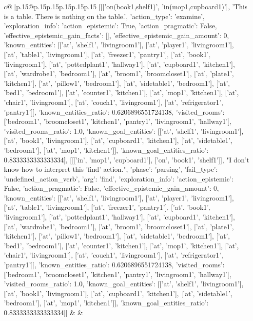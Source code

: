\documentclass{article}
\begin{document}
{\begin{supertabular}{c@{$\;$}|p{.15\linewidth}@{}p{.15\linewidth}p{.15\linewidth}p{.15\linewidth}p{.15\linewidth}p{.15\linewidth}}
{{{	 [[['on(book1,shelf1)', 'in(mop1,cupboard1)'], 'This is a table. There is nothing on the table.', {'action_type': 'examine', 'exploration_info': {'action_epistemic': True, 'action_pragmatic': False, 'effective_epistemic_gain_facts': [], 'effective_epistemic_gain_amount': 0, 'known_entities': [['at', 'shelf1', 'livingroom1'], ['at', 'player1', 'livingroom1'], ['at', 'table1', 'livingroom1'], ['at', 'freezer1', 'pantry1'], ['at', 'book1', 'livingroom1'], ['at', 'pottedplant1', 'hallway1'], ['at', 'cupboard1', 'kitchen1'], ['at', 'wardrobe1', 'bedroom1'], ['at', 'broom1', 'broomcloset1'], ['at', 'plate1', 'kitchen1'], ['at', 'pillow1', 'bedroom1'], ['at', 'sidetable1', 'bedroom1'], ['at', 'bed1', 'bedroom1'], ['at', 'counter1', 'kitchen1'], ['at', 'mop1', 'kitchen1'], ['at', 'chair1', 'livingroom1'], ['at', 'couch1', 'livingroom1'], ['at', 'refrigerator1', 'pantry1']], 'known_entities_ratio': 0.6206896551724138, 'visited_rooms': ['bedroom1', 'broomcloset1', 'kitchen1', 'pantry1', 'livingroom1', 'hallway1'], 'visited_rooms_ratio': 1.0, 'known_goal_entities': [['at', 'shelf1', 'livingroom1'], ['at', 'book1', 'livingroom1'], ['at', 'cupboard1', 'kitchen1'], ['at', 'sidetable1', 'bedroom1'], ['at', 'mop1', 'kitchen1']], 'known_goal_entities_ratio': 0.8333333333333334}}], [[['in', 'mop1', 'cupboard1'], ['on', 'book1', 'shelf1']], "I don't know how to interpret this 'find' action.", {'phase': 'parsing', 'fail_type': 'undefined_action_verb', 'arg': 'find', 'exploration_info': {'action_epistemic': False, 'action_pragmatic': False, 'effective_epistemic_gain_amount': 0, 'known_entities': [['at', 'shelf1', 'livingroom1'], ['at', 'player1', 'livingroom1'], ['at', 'table1', 'livingroom1'], ['at', 'freezer1', 'pantry1'], ['at', 'book1', 'livingroom1'], ['at', 'pottedplant1', 'hallway1'], ['at', 'cupboard1', 'kitchen1'], ['at', 'wardrobe1', 'bedroom1'], ['at', 'broom1', 'broomcloset1'], ['at', 'plate1', 'kitchen1'], ['at', 'pillow1', 'bedroom1'], ['at', 'sidetable1', 'bedroom1'], ['at', 'bed1', 'bedroom1'], ['at', 'counter1', 'kitchen1'], ['at', 'mop1', 'kitchen1'], ['at', 'chair1', 'livingroom1'], ['at', 'couch1', 'livingroom1'], ['at', 'refrigerator1', 'pantry1']], 'known_entities_ratio': 0.6206896551724138, 'visited_rooms': ['bedroom1', 'broomcloset1', 'kitchen1', 'pantry1', 'livingroom1', 'hallway1'], 'visited_rooms_ratio': 1.0, 'known_goal_entities': [['at', 'shelf1', 'livingroom1'], ['at', 'book1', 'livingroom1'], ['at', 'cupboard1', 'kitchen1'], ['at', 'sidetable1', 'bedroom1'], ['at', 'mop1', 'kitchen1']], 'known_goal_entities_ratio': 0.8333333333333334}}]] 
	  } 
	   } 
	   } 
	 & & \\ 
 


\end{supertabular}}
\end{document}
